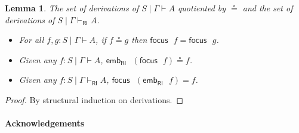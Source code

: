\documentclass[submission,copyright,creativecommons]{eptcs}
\newtheorem{lemma}[theorem]{Lemma}
\theoremstyle{definition}
\newcommand{\RI}{\mathsf{RI}}
\begin{document}
\begin{lemma}
  The set of derivations of $S \mid \Gamma \vdash A$ quotiented by $\circeq$ and the set of derivations of $S \mid \Gamma \vdash_{\RI} A$.
  \begin{itemize}
    \item For all $f, g : S \mid \Gamma \vdash A$, if $f \circeq g$ then $\mathsf{focus} \text{ } f = \mathsf{focus} \text{ } g$.
    \item Given any $f : S \mid \Gamma \vdash A$, $\mathsf{emb}_{\RI} \text{ } (\mathsf{focus} \text{ } f) \circeq f$.
    \item Given any $f : S \mid \Gamma \vdash_{\RI} A$, $\mathsf{focus} \text{ } (\mathsf{emb}_{\RI} \text{ } f) = f$.
  \end{itemize}
\end{lemma}
\begin{proof}
  By structural induction on derivations.
\end{proof}

\paragraph{Acknowledgements} 

  
  
\end{document}
